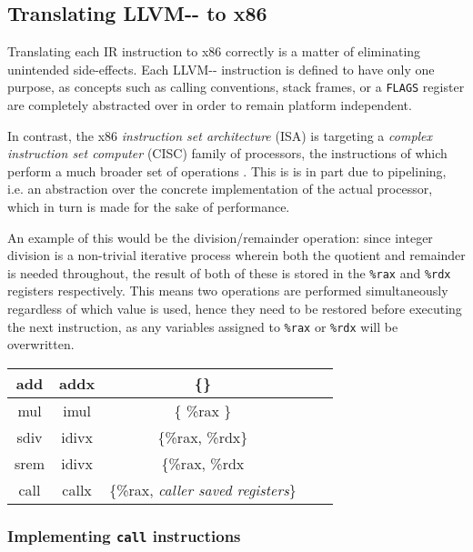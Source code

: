 \documentclass{article}
\begin{document}
\subsection{Translating LLVM-{}- to x86}

Translating each IR instruction to x86 correctly is a matter of eliminating unintended side-effects. Each LLVM-{}- instruction is defined to have only one purpose, %
as concepts such as calling conventions, stack frames, or a \lstinline!FLAGS! register are completely abstracted over in order to remain platform independent.

In contrast, the x86 \textit{instruction set architecture} (ISA) is targeting a  \textit{complex instruction set computer} (CISC) family of processors, the instructions of which perform a much broader set of operations \cite[p.~190]{tiger}. This is is in part due to pipelining, i.e. an abstraction over the concrete implementation of the actual processor, which in turn is made for the sake of performance.

An example of this would be the division/remainder operation: since integer division is a non-trivial iterative process wherein both the quotient and remainder is needed throughout, the result of both of these is stored in the \lstinline!%rax! and \lstinline!%rdx! registers respectively. This means two operations are performed simultaneously regardless of which value is used, hence they need to be restored before executing the next instruction, as any variables assigned to \lstinline!%rax! or \lstinline!%rdx! will be overwritten.

\begin{center}
\begin{tabular}{|c||c|c|c|c|} 
 \hline
 add & addx & \{\}\\
 \hline
 mul & imul & \{ \%rax \} \\
 \hline
 sdiv & idivx & \{\%rax, \%rdx\} \\
 \hline
 srem & idivx & \{\%rax, \%rdx \\
 \hline
   call & callx & \{\%rax, \textit{caller saved registers}\} \\
 \hline
 \hline
\end{tabular}
\end{center}


\subsubsection{Implementing \texttt{call} instructions}
\end{document}
